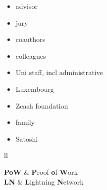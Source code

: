 \documentclass[
11pt, %
english, %
singlespacing, %
headsepline, %
]{MastersDoctoralThesis} %
\begin{document}

\begin{acknowledgements}
\addchaptertocentry{\acknowledgementname} %
\begin{itemize}
	\item advisor
	\item jury
	\item coauthors
	\item colleagues
	\item Uni staff, incl administrative
	\item Luxembourg
	\item Zcash foundation
	\item family
	\item Satoshi
\end{itemize}
\end{acknowledgements}


\tableofcontents %

\listoffigures %

\listoftables %


\begin{abbreviations}{ll} %

\textbf{PoW} & \textbf{P}roof \textbf{o}f \textbf{W}ork\\
\textbf{LN} & \textbf{L}ightning \textbf{N}etwork\\

\end{abbreviations}

\end{document}
